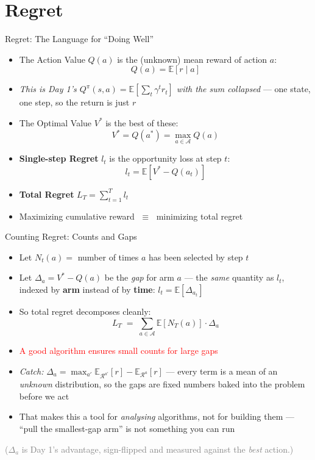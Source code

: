 \section{Regret}
\begin{frame}{Regret: The Language for ``Doing Well''}
\begin{itemize}
    \item The Action Value $Q(a)$ is the (unknown) mean reward of action $a$:
    \[
        Q(a) = \mathbb{E}[r \mid a]
    \]
    \item \emph{This is Day 1's $Q^\pi(s,a) = \mathbb{E}[\sum_t \gamma^t r_t]$ with the sum collapsed} --- one state, one step, so the return is just $r$
    \item The Optimal Value $V^*$ is the best of these:
    \[
        V^* = Q(a^*) = \max_{a \in \mathcal{A}} Q(a)
    \]
    \item \textbf{Single-step Regret} $l_t$ is the opportunity loss at step $t$:
    \[
        l_t = \mathbb{E}[V^* - Q(a_t)]
    \]
    \item \textbf{Total Regret} $L_T = \sum_{t=1}^{T} l_t$
    \item Maximizing cumulative reward $\;\equiv\;$ minimizing total regret
\end{itemize}
\end{frame}

\begin{frame}{Counting Regret: Counts and Gaps}
\begin{itemize}
    \setlength{\itemsep}{0.35em}
    \item Let $N_t(a) = $ number of times $a$ has been selected by step $t$
    \item Let $\Delta_a = V^* - Q(a)$ be the \emph{gap} for arm $a$ --- the \emph{same} quantity as $l_t$, indexed by \textbf{arm} instead of by \textbf{time}: $l_t = \mathbb{E}[\Delta_{a_t}]$
    \item So total regret decomposes cleanly:
    \[
        L_T \;=\; \sum_{a \in \mathcal{A}} \mathbb{E}[N_T(a)] \cdot \Delta_a
    \]
    \item \textcolor{red}{A good algorithm ensures small counts for large gaps}
    \item \emph{Catch:} $\Delta_a = \max_{a'} \mathbb{E}_{\mathcal{R}^{a'}}[r] - \mathbb{E}_{\mathcal{R}^{a}}[r]$ --- every term is a mean of an \emph{unknown} distribution, so the gaps are fixed numbers baked into the problem before we act
    \item That makes this a tool for \emph{analysing} algorithms, not for building them --- ``pull the smallest-gap arm'' is not something you can run
\end{itemize}
\centering\small\textcolor{gray}{($\Delta_a$ is Day 1's advantage, sign-flipped and measured against the \emph{best} action.)}
\end{frame}

